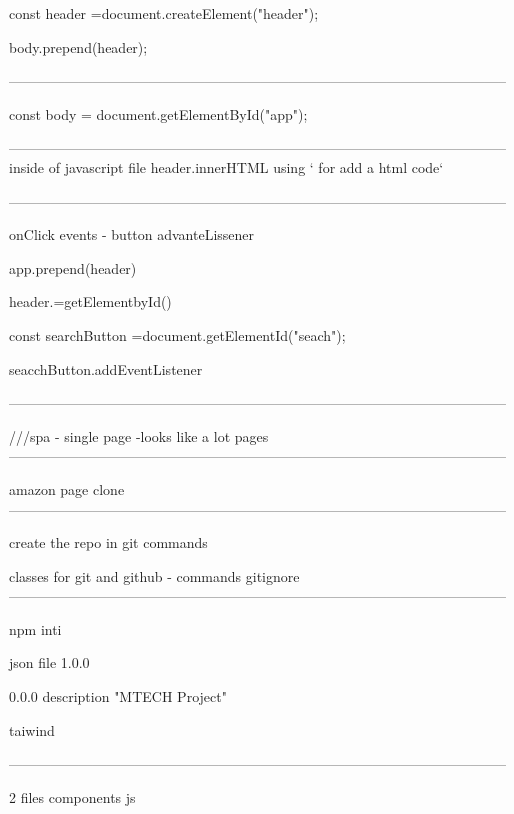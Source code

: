 const header =document.createElement("header");




body.prepend(header);

-----------------------------------------------------------------------------------------------------------


const body = document.getElementById("app");

-----------------------------------------------------------------------------------------------------------
inside of javascript file
header.innerHTML
using ` for add a html code`


-----------------------------------------------------------------------------------------------------------

onClick events - button 
advanteLissener

app.prepend(header)


header.=getElementbyId()


const searchButton =document.getElementId("seach");

seacchButton.addEventListener

-----------------------------------------------------------------------------------------------------------



///spa - single page -looks like a lot pages
-----------------------------------------------------------------------------------------------------------

amazon page clone
-----------------------------------------------------------------------------------------------------------



create the repo in git commands

classes for git and github - commands 
gitignore
-----------------------------------------------------------------------------------------------------------


npm inti 


json file 
1.0.0

0.0.0
description "MTECH Project"

taiwind

-----------------------------------------------------------------------------------------------------------

2 files
components
js
